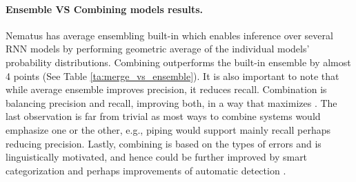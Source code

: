 \documentclass[11pt,a4paper]{article}
\begin{document}
\begin{table}[htb]
\caption{Combining with off the shelf systems helps. \label{ta:off_shelf}}
\end{table}

\paragraph{Ensemble VS Combining models results.} \label{subsec:ensemble_compare}
Nematus has average ensembling built-in which enables inference over several RNN models by performing geometric average of the individual models' probability distributions.  Combining outperforms the built-in ensemble by almost 4 points (See Table \ref{ta:merge_vs_ensemble}). It is also important to note that while average ensemble improves precision, it reduces recall. Combination is balancing precision and recall, improving both, in a way that maximizes . The last observation is far from trivial as most ways to combine systems would emphasize one or the other, e.g., piping would support mainly recall perhaps reducing precision. Lastly, combining is based on the types of errors and is linguistically motivated, and hence could be further improved by smart categorization and perhaps improvements of automatic detection \cite{Bryant2017AutomaticAA}.
\end{document}
